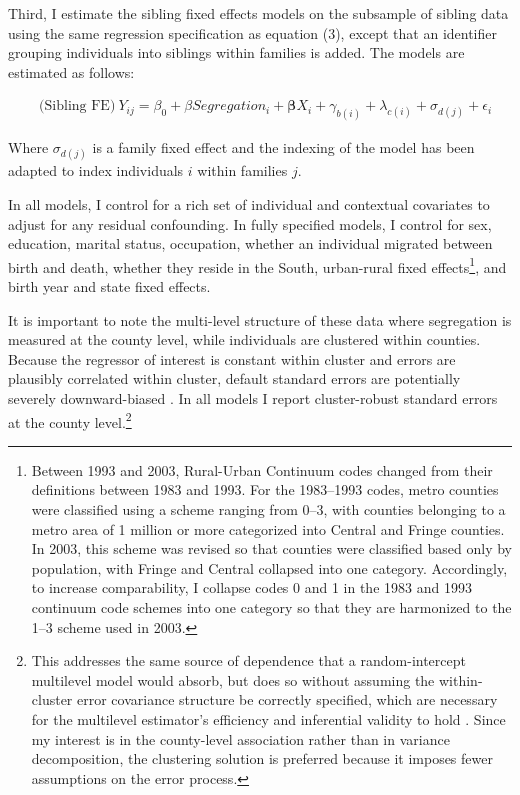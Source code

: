 \documentclass[11pt]{article}
\begin{document}
Third, I estimate the sibling fixed effects models on the subsample of sibling data using the same regression specification as equation (3), except that an identifier grouping individuals into siblings within families is added. The models are estimated as follows: 

\begin{align} 
&\text{(Sibling FE)} \ Y_{ij} = \beta_0 + \beta Segregation_{i} +  \pmb{\beta} X_i + \gamma_{b(i)} + \lambda_{c(i)} + \sigma_{d(j)} + \epsilon_i 
\end{align}

Where $\sigma_{d(j)}$ is a family fixed effect and the indexing of the model has been adapted to index individuals $i$ within families $j$. 

In all models, I control for a rich set of individual and contextual covariates to adjust for any residual confounding.
In fully specified models, I control for sex, education, marital status, occupation, whether an individual migrated between birth and death, whether they reside in the South, urban-rural fixed effects\footnote{Between 1993 and 2003, Rural-Urban Continuum codes changed from their definitions between 1983 and 1993. For the 1983--1993 codes, metro counties were classified using a scheme ranging from 0--3, with counties belonging to a metro area of 1 million or more categorized into Central and Fringe counties. In 2003, this scheme was revised so that counties were classified based only by population, with Fringe and Central collapsed into one category. Accordingly, to increase comparability, I collapse codes 0 and 1 in the 1983 and 1993 continuum code schemes into one category so that they are harmonized to the 1--3 scheme used in 2003.}, and birth year and state fixed effects. 

It is important to note the multi-level structure of these data where segregation is measured at the county level, while individuals are clustered within counties. Because the regressor of interest is 
constant within cluster and errors are plausibly correlated within cluster, default 
standard errors are potentially severely downward-biased \citep{moulton_illustration_1990, 
cameron_practitioners_2015}. In all models I report cluster-robust standard 
errors at the county level.\footnote{This addresses the same source of dependence that a 
random-intercept multilevel model would absorb, but does so without assuming the within-cluster error 
covariance structure be correctly specified, which are necessary for the multilevel estimator's efficiency and inferential validity to hold \citep{cameron_practitioners_2015}. Since my interest is in the county-level association rather than in variance decomposition, the clustering solution is preferred because it imposes fewer assumptions on the error process.}
\end{document}
